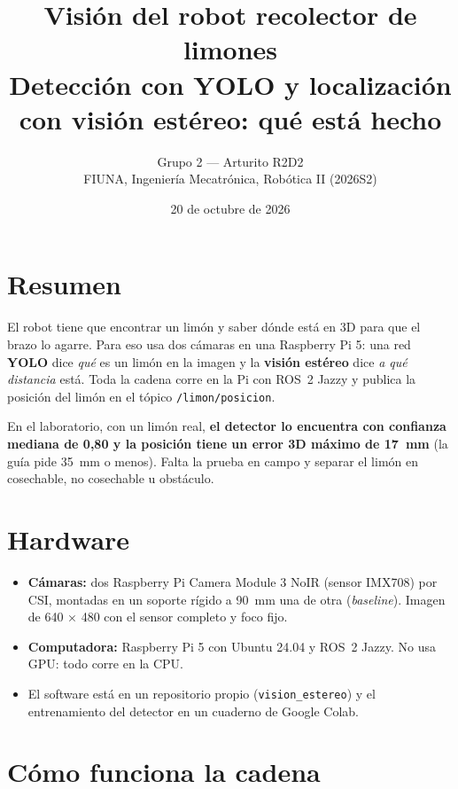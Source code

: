 \documentclass[11pt,a4paper]{article}
\title{\textbf{Visión del robot recolector de limones}\\[4pt]
\large Detección con YOLO y localización con visión estéreo: qué está hecho}
\author{Grupo 2 --- Arturito R2D2\\FIUNA, Ingeniería Mecatrónica, Robótica II (2026S2)}
\date{20 de octubre de 2026}
\newcommand{\cod}[1]{\texttt{#1}}
\begin{document}
\maketitle

\section*{Resumen}
El robot tiene que encontrar un limón y saber dónde está en 3D para que el brazo lo agarre. Para eso usa dos
cámaras en una Raspberry Pi 5: una red \textbf{YOLO} dice \emph{qué} es un limón en la imagen y la
\textbf{visión estéreo} dice \emph{a qué distancia} está. Toda la cadena corre en la Pi con ROS~2 Jazzy y publica la
posición del limón en el tópico \cod{/limon/posicion}.

En el laboratorio, con un limón real, \textbf{el detector lo encuentra con confianza mediana de 0,80 y la posición
tiene un error 3D máximo de 17~mm} (la guía pide 35~mm o menos). Falta la prueba en campo y separar el limón en
cosechable, no cosechable u obstáculo.

\section{Hardware}
\begin{itemize}
  \item \textbf{Cámaras:} dos Raspberry Pi Camera Module 3 NoIR (sensor IMX708) por CSI, montadas en un soporte
        rígido a 90~mm una de otra (\emph{baseline}). Imagen de 640 × 480 con el sensor completo y foco fijo.
  \item \textbf{Computadora:} Raspberry Pi 5 con Ubuntu 24.04 y ROS~2 Jazzy. No usa GPU: todo corre en la CPU.
  \item El software está en un repositorio propio (\cod{vision\_estereo}) y el entrenamiento del detector en un
        cuaderno de Google Colab.
\end{itemize}

\section{Cómo funciona la cadena}
\end{document}
